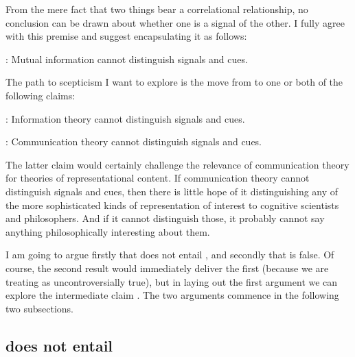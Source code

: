 \documentclass[12pt]{article}
\begin{document}
From the mere fact that two things bear a correlational relationship, no conclusion can be drawn about whether one is a signal of the other.
I fully agree with this premise and suggest encapsulating it as follows:

\begin{myquote}
\ami: Mutual information cannot distinguish signals and cues.
\end{myquote}

\noindent The path to scepticism I want to explore is the move from \ami{} to one or both of the following claims:

\begin{myquote}
\ait: Information theory cannot distinguish signals and cues.
\end{myquote}

\begin{myquote}
\act: Communication theory cannot distinguish signals and cues.
\end{myquote}

\noindent The latter claim would certainly challenge the relevance of communication theory for theories of representational content.
If communication theory cannot distinguish signals and cues, then there is little hope of it distinguishing any of the more sophisticated kinds of representation of interest to cognitive scientists and philosophers.
And if it cannot distinguish those, it probably cannot say anything philosophically interesting about them.

I am going to argue firstly that \ami{} does not entail \act{}, and secondly that \act{} is false.
Of course, the second result would immediately deliver the first (because we are treating \ami{} as uncontroversially true), but in laying out the first argument we can explore the intermediate claim \ait{}.
The two arguments commence in the following two subsections.

\subsection{\ami{} does not entail \act{}}
\end{document}

